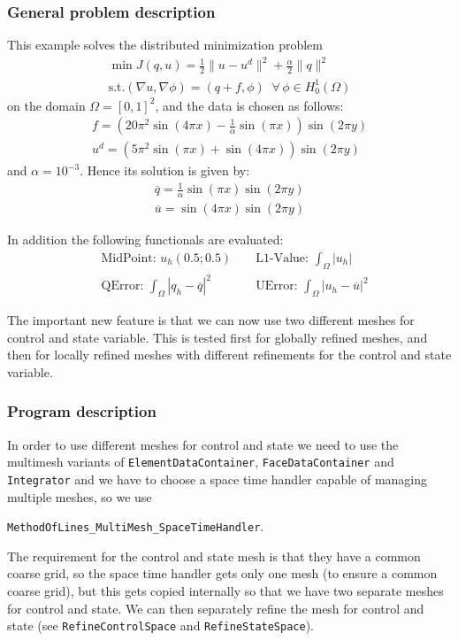 \subsubsection{General problem description}
This example solves the distributed minimization problem
\begin{gather*}
\min J(q,u) = \frac{1}{2} \|u-u^d\|^2 + \frac{\alpha}{2}\|q\|^2\\
\text{s.t.} (\nabla u,\nabla \phi) = (q+f,\phi)\;\;\forall\,\phi \in H^1_0(\Omega)
\end{gather*}
on the domain $\Omega = [0,1]^2$, and the data is chosen as follows:
\begin{gather*}
 f = \left(20\pi^2  \sin(4 \pi x) - \frac{1}{\alpha}  \sin(\pi x)\right) \sin(2 \pi y)\\
 u^d = \left( 5 \pi^2 \sin(\pi x) + \sin(4 \pi x)\right)  \sin(2\pi y)
\end{gather*}
and $\alpha = 10^{-3}$.
Hence its solution is given by:
\begin{gather*}
 \overline{q} = \frac{1}{\alpha} \sin(\pi x) \sin(2 \pi y)\\
 \overline{u} = \sin(4 \pi x) \sin(2 \pi y)
\end{gather*}

In addition the following functionals are evaluated:
\begin{align*}
  &\text{MidPoint: } u_h(0.5 ; 0.5)&&
  \text{ L1-Value: }\int_\Omega |u_h|\\
  &\text{QError: }\int_\Omega |q_h-\overline{q}|^2
  &&\text{  UError: }\int_\Omega |u_h-\overline{u}|^2
\end{align*}
 
The important new feature is that we can now use two different meshes for control and state variable.
This is tested first for globally refined meshes, and then for locally refined meshes with different refinements for the control and state variable.
\subsubsection{Program description}
In order to use different meshes for control and state we need to use the multimesh variants of \texttt{ElementDataContainer}, \texttt{FaceDataContainer} and \texttt{Integrator} and we have to choose a space time handler capable of managing multiple meshes, so we use 

\texttt{MethodOfLines\_MultiMesh\_SpaceTimeHandler}.

The requirement for the control and state mesh is that they have a common coarse grid, so the space time handler gets only one mesh (to ensure a common coarse grid), but this gets copied internally so that we have two separate meshes for control and state. We can then separately refine the mesh for control and state (see \texttt{RefineControlSpace} and  \texttt{RefineStateSpace}).

